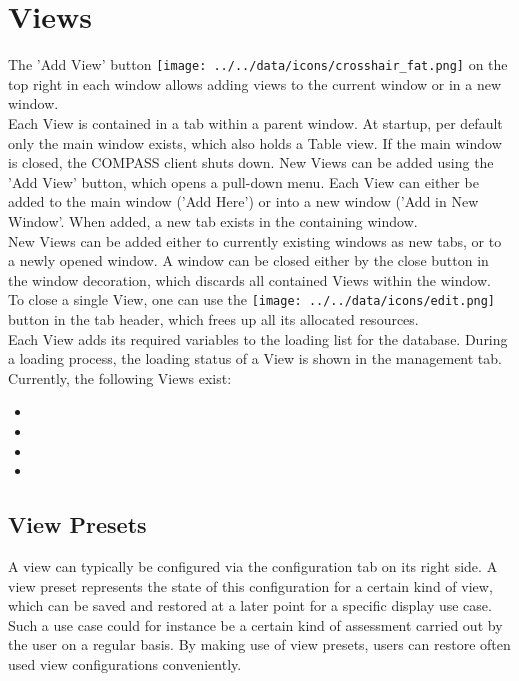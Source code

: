 \section{Views}
The 'Add View' button \texttt{[image: ../../data/icons/crosshair\_fat.png]} on the top right in each window allows adding views to the current window or in a new window. \\

Each View is contained in a tab within a parent window.  At startup, per default only the main window exists, which also holds
a Table view. If the main window is closed, the COMPASS client shuts down. New Views can be added using the 'Add View' button, which opens a pull-down menu. Each View can either be added to the main window ('Add Here') or into a new window ('Add in New Window'. When added, a new tab exists in the containing window. \\

New Views can be added either to currently existing windows as new tabs, or to a newly opened window. A window can be closed either by the close button in the window decoration, which discards all contained Views within the window.  \\

To close a single View, one can use the \texttt{[image: ../../data/icons/edit.png]} button in the tab header, which frees up all its allocated resources. \\

Each View adds its required variables to the loading list for the database. During a loading process, the loading status  of a View is shown in the management tab.\\

Currently, the following Views exist:
\begin{itemize}
 \item {}
 \item {}
 \item {}
 \item {}
\end{itemize}

\subsection{View Presets}

A view can typically be configured via the configuration tab on its right side.
A view preset represents the state of this configuration for a certain kind of view,
which can be saved and restored at a later point for a specific display use case. 
Such a use case could for instance be a certain kind of assessment carried out by the user
on a regular basis. By making use of view presets, users can restore often used view configurations conveniently. \\

